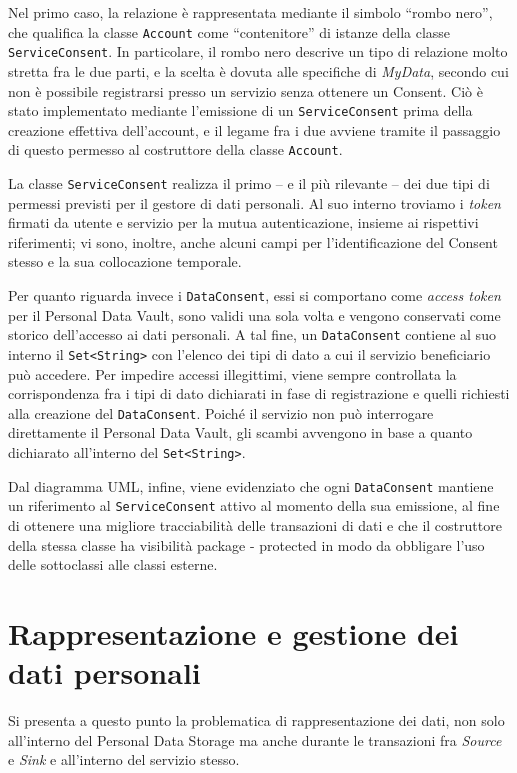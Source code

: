 Nel primo caso, la relazione \`e rappresentata mediante il simbolo “rombo nero”, che qualifica la classe \texttt{Account} come “contenitore” di istanze della classe \texttt{ServiceConsent}. In particolare, il rombo nero descrive un tipo di relazione molto stretta fra le due parti, e la scelta \`e dovuta alle specifiche di \textit{MyData}, secondo cui non \`e possibile registrarsi presso un servizio senza ottenere un Consent. Ci\`o \`e stato implementato mediante l’emissione di un \texttt{ServiceConsent} prima della creazione effettiva dell’account, e il legame fra i due avviene tramite il passaggio di questo permesso al costruttore della classe \texttt{Account}.

La classe \texttt{ServiceConsent} realizza il primo – e il pi\`u rilevante – dei due tipi di permessi previsti per il gestore di dati personali. Al suo interno troviamo i \textit{token} firmati da utente e servizio per la mutua autenticazione, insieme ai rispettivi riferimenti; vi sono, inoltre, anche alcuni campi per l’identificazione del Consent stesso e la sua collocazione temporale.

Per quanto riguarda invece i \texttt{DataConsent}, essi si comportano come \textit{access token} per il Personal Data Vault, sono validi una sola volta e vengono conservati come storico dell’accesso ai dati personali. A tal fine, un \texttt{DataConsent} contiene al suo interno il \texttt{Set<String>} con l’elenco dei tipi di dato a cui il servizio beneficiario pu\`o accedere. Per impedire accessi illegittimi, viene sempre controllata la corrispondenza fra i tipi di dato dichiarati in fase di registrazione e quelli richiesti alla creazione del \texttt{DataConsent}. Poich\'e il servizio non pu\`o interrogare direttamente il Personal Data Vault, gli scambi avvengono in base a quanto dichiarato all’interno del \texttt{Set<String>}.

Dal diagramma UML, infine, viene evidenziato che ogni \texttt{DataConsent} mantiene un riferimento al \texttt{ServiceConsent} attivo al momento della sua emissione, al fine di ottenere una migliore tracciabilit\`a delle transazioni di dati e che il costruttore della stessa classe ha visibilit\`a package - protected in modo da obbligare l’uso delle sottoclassi alle classi esterne.

\section{Rappresentazione e gestione dei dati personali}
\label{sec:P-datinonnotiapriori}
Si presenta a questo punto la problematica di rappresentazione dei dati, non solo all’interno del Personal Data Storage ma anche durante le transazioni fra \textit{Source} e \textit{Sink} e all’interno del servizio stesso.

